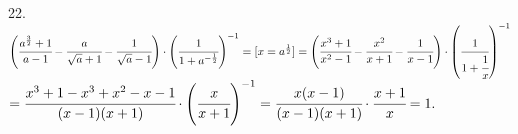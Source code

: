 22. $\left(\cfrac{a^\frac{3}{2}+1}{a-1}-\cfrac{a}{\sqrt{a}+1}-\cfrac{1}{\sqrt{a}-1}\right)\cdot\left(\cfrac{1}{1+a^{-\frac{1}{2}}}\right)^{-1}=[x=a^\frac{1}{2}]=
\left(\cfrac{x^3+1}{x^2-1}-\cfrac{x^2}{x+1}-\cfrac{1}{x-1}\right)\cdot\left(\cfrac{1}{1+\cfrac{1}{x}}\right)^{-1}$\\$=
\cfrac{x^3+1-x^3+x^2-x-1}{(x-1)(x+1)}\cdot\left(\cfrac{x}{x+1}\right)^{-1}=
\cfrac{x(x-1)}{(x-1)(x+1)}\cdot\cfrac{x+1}{x}=1.$\\
